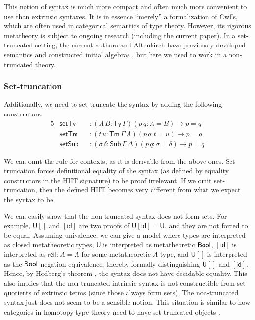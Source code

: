 \documentclass[dvipsnames]{lmcs} %
\newcommand{\U}{\mathsf{U}}
\newcommand{\ra}{\rightarrow}
\newcommand{\Ty}{\mathsf{Ty}}
\newcommand{\Tm}{\mathsf{Tm}}
\newcommand{\Sub}{\mathsf{Sub}}
\newcommand{\id}{\mathsf{id}}
\newcommand{\refl}{\mathsf{refl}}
\newcommand{\1}{\mathsf{1}} \renewcommand{\Pr}{\mathsf{Pr}}
\theoremstyle{plain}\newtheorem{satz}[thm]{Satz} %
\begin{document}
This notion of syntax is much more compact and often much more convenient to use
than extrinsic syntaxes. It is in essence ``merely'' a formalization of CwFs,
which are often used in categorical semantics of type theory. However, its
rigorous metatheory is subject to ongoing research (including the current
paper). In a set-truncated setting, the current authors and Altenkirch have
previously developed semantics and constructed initial algebras
\cite{kaposi2019constructing}, but here we need to work in a non-truncated
theory.

\subsubsection{Set-truncation}
Additionally, we need to set-truncate the syntax by adding the following constructors:
\begin{alignat*}{5}
  & \mathsf{setTy}  && : (A\,B : \Ty\,\Gamma)(p\,q : A = B)\ra p = q \\
  & \mathsf{setTm}  && : (t\,u : \Tm\,\Gamma\,A)(p\,q : t = u)\ra p = q \\
  & \mathsf{setSub} && : (\sigma\,\delta : \Sub\,\Gamma\,\Delta)(p\,q : \sigma = \delta)\ra p = q
\end{alignat*}

\noindent We can omit the rule for contexts, as it is derivable from the above ones. Set
truncation forces definitional equality of the syntax (as defined by equality
constructors in the HIIT signature) to be proof irrelevant. If we omit
set-truncation, then the defined HIIT becomes very different from what we expect
the syntax to be.

We can easily show that the non-truncated syntax does not form sets. For
example, $\U[]$ and $[\id]$ are two proofs of $\U[\id] = \U$, and they are not
forced to be equal. Assuming univalence, we can give a model where types are
interpreted as closed metatheoretic types, $\U$ is interpreted as metatheoretic
$\mathsf{Bool}$, $[\id]$ is interpreted as $\refl : A = A$ for some metatheoretic $A$
type, and $\U[]$ is interpreted as the $\mathsf{Bool}$ negation equivalence, thereby
formally distinguishing $\U[]$ and $[\id]$. Hence, by Hedberg's theorem
\cite{hedberg}, the syntax does not have decidable equality. This also implies
that the non-truncated intrinsic syntax is not constructible from set quotients
of extrinsic terms (since those always form sets). The non-truncated syntax just
does not seem to be a sensible notion. This situation is similar to how
categories in homotopy type theory need to have set-truncated objects
\cite{ahrens2015univalent}.
\end{document}
